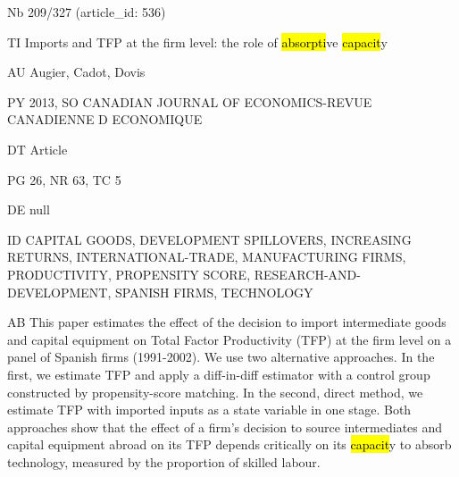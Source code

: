 \documentclass[a4paper]{article}
\begin{document}
\vspace*{-2cm}
Nb \tabto{0cm}209/327 (article\_id: 536)\par
TI \tabto{0cm}Imports and TFP at the firm level: the role of \hl{absorpti}ve \hl{capacit}y\par
AU \tabto{0cm}Augier, Cadot, Dovis\par
PY \tabto{0cm}2013, SO CANADIAN JOURNAL OF ECONOMICS-REVUE CANADIENNE D ECONOMIQUE\par
DT \tabto{0cm}Article\par
PG \tabto{0cm}26, NR 63, TC 5\par
DE \tabto{0cm}null\par
ID \tabto{0cm}CAPITAL GOODS, DEVELOPMENT SPILLOVERS, INCREASING RETURNS, INTERNATIONAL-TRADE, MANUFACTURING FIRMS, PRODUCTIVITY, PROPENSITY SCORE, RESEARCH-AND-DEVELOPMENT, SPANISH FIRMS, TECHNOLOGY\par
AB \tabto{0cm}This paper estimates the effect of the decision to import intermediate goods and capital equipment on Total Factor Productivity (TFP) at the firm level on a panel of Spanish firms (1991-2002). We use two alternative approaches. In the first, we estimate TFP and apply a diff-in-diff estimator with a control group constructed by propensity-score matching. In the second, direct method, we estimate TFP with imported inputs as a state variable in one stage. Both approaches show that the effect of a firm's decision to source intermediates and capital equipment abroad on its TFP depends critically on its \hl{capacit}y to absorb technology, measured by the proportion of skilled labour.\par
\clearpage
\end{document}
